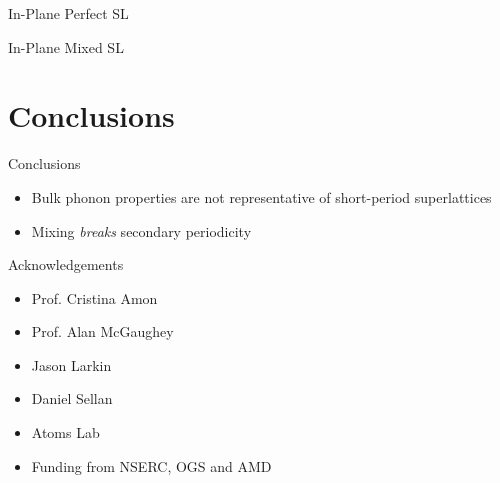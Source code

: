 \documentclass{beamer}
\begin{document}
\begin{frame}{In-Plane Perfect SL}
\begin{figure}[t]
\begin{center}
\vspace*{-0.8cm}
\renewcommand{\figure}{Fig.}
\label{fig:ip}
\end{center}
\end{figure}
\end{frame}

\begin{frame}{In-Plane Mixed SL}
\begin{figure}[t]
\begin{center}
\vspace*{-0.8cm}
\renewcommand{\figure}{Fig.}
\label{fig:ip_all}
\end{center}
\end{figure}
\end{frame}

\section{Conclusions}
\begin{frame}{Conclusions}
\begin{itemize}
\item Bulk phonon properties are not representative of short-period superlattices
\item Mixing \textit{breaks} secondary periodicity
\end{itemize}
\end{frame}


\begin{frame}{Acknowledgements}
\begin{itemize}
\item Prof. Cristina Amon
\item Prof. Alan McGaughey
\item Jason Larkin
\item Daniel Sellan
\item Atoms Lab
\item Funding from NSERC, OGS and AMD
\end{itemize}
\end{frame}
\end{document}
